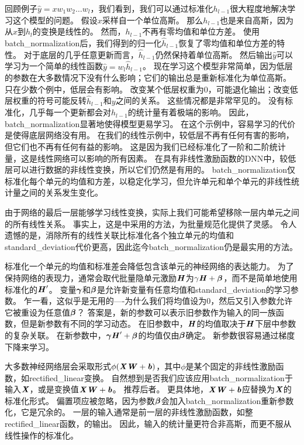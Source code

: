 回顾例子$\hat{y} = x w_1 w_2 … w_l$，我们看到，我们可以通过标准化$h_{l-1}$很大程度地解决学习这个模型的问题。
假设$x$采样自一个单位高斯。
那么$h_{l-1}$也是来自高斯，因为从$x$到$h_l$的变换是线性的。
然而，$h_{l-1}$不再有零均值和单位方差。
使用\gls{batch_normalization}后，我们得到的归一化$\hat{h}_{l-1}$恢复了零均值和单位方差的特性。
对于底层的几乎任意更新而言，$\hat{h}_{l-1}$仍然保持着单位高斯。
然后输出$\hat{y}$可以学习为一个简单的线性函数$\hat{y} = w_l \hat{h}_{l-1}$。
现在学习这个模型非常简单，因为低层的参数在大多数情况下没有什么影响；它们的输出总是重新标准化为单位高斯。
只在少数个例中，低层会有影响。
改变某个低层权重为$0$，可能退化输出；改变低层权重的符号可能反转$\hat{h}_{l-1}$和$y$之间的关系。
这些情况都是非常罕见的。
没有标准化，几乎每一个更新都会对$h_{l-1}$的统计量有着极端的影响。
因此，\gls{batch_normalization}显著地使得模型更易学习。
在这个示例中，容易学习的代价是使得底层网络没有用。
在我们的线性示例中，较低层不再有任何有害的影响，但它们也不再有任何有益的影响。
这是因为我们已经标准化了一阶和二阶统计量，这是线性网络可以影响的所有因素。
在具有非线性激励函数的\gls{DNN}中，较低层可以进行数据的非线性变换，所以它们仍然是有用的。
\gls{batch_normalization}仅标准化每个单元的均值和方差，以稳定化学习，但允许单元和单个单元的非线性统计量之间的关系发生变化。

由于网络的最后一层能够学习线性变换，实际上我们可能希望移除一层内单元之间的所有线性关系。
事实上，这是\cite{Desjardins2015}中采用的方法，为批量规范化提供了灵感。
令人遗憾的是，消除所有的线性关联比标准化各个独立单元的均值和\gls{standard_deviation}代价更高，因此迄今\gls{batch_normalization}仍是最实用的方法。


标准化一个单元的均值和标准差会降低包含该单元的神经网络的表达能力。
为了保持网络的表现力，通常会取代批量隐单元激励$\boldsymbol{\mathit{H}}$为$\gamma \boldsymbol{\mathit{H}} + \boldsymbol{\beta}$，而不是简单地使用标准化的$\boldsymbol{\mathit{H}}'$。
变量$\boldsymbol{\gamma}$和$\boldsymbol{\beta}$是允许新变量有任意均值和\gls{standard_deviation}的学习参数。
乍一看，这似乎是无用的----为什么我们将均值设为$0$，然后又引入参数允许它被重设为任意值$\boldsymbol{\beta}$？
答案是，新的参数可以表示旧参数作为输入的同一族函数，但是新参数有不同的学习动态。
在旧参数中，$\boldsymbol{\mathit{H}}$的均值取决于$\boldsymbol{\mathit{H}}$下层中参数的复杂关联。
在新参数中，$\boldsymbol{\gamma} \boldsymbol{\mathit{H}}' + \boldsymbol{\beta}$的均值仅由$\boldsymbol{\beta}$确定。
新参数很容易通过梯度下降来学习。

大多数神经网络层会采取形式$\phi(\boldsymbol{\mathit{X}}\boldsymbol{\mathit{W}}+ \boldsymbol{\mathit{b}})$，其中$\phi$是某个固定的非线性激励函数，如\gls{rectified_linear}变换。
自然想到是否我们应该应用\gls{batch_normalization}于输入$\boldsymbol{\mathit{X}}$，或是变换值$\boldsymbol{\mathit{X}}\boldsymbol{\mathit{W}}+\boldsymbol{\mathit{b}}$。
\cite{Ioffe+Szegedy-2015}推荐后者。
更具体地，$\boldsymbol{\mathit{X}}\boldsymbol{\mathit{W}}+\boldsymbol{\mathit{b}}$应替换为$\boldsymbol{\mathit{X}}$的标准化形式。
偏置项应被忽略，因为参数$\boldsymbol{\beta}$会加入\gls{batch_normalization}重新参数化，它是冗余的。
一层的输入通常是前一层的非线性激励函数，如整\gls{rectified_linear}函数，的输出。
因此，输入的统计量更符合非高斯，而更不服从线性操作的标准化。

